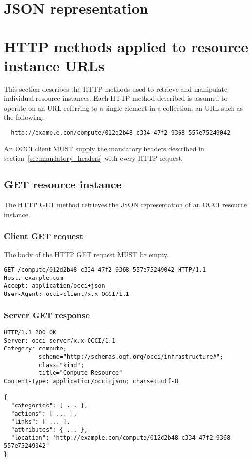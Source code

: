 \documentclass[10pt,a4paper]{article}
\begin{document}
\section{JSON representation}

\section{HTTP methods applied to resource instance URLs}

This section describes the HTTP methods used to retrieve and manipulate
individual resource instances. Each HTTP method described is assumed to operate
on an URL referring to a single element in a collection, an URL such as the
following:
\begin{verbatim}
  http://example.com/compute/012d2b48-c334-47f2-9368-557e75249042
\end{verbatim}

An OCCI client MUST supply the mandatory headers described in
section~\ref{sec:mandatory_headers} with every HTTP request.

\subsection{GET resource instance}
The HTTP GET method retrieves the JSON representation of an OCCI resource
instance.

\subsubsection{Client GET request}
The body of the HTTP GET request MUST be empty.
\begin{verbatim}
GET /compute/012d2b48-c334-47f2-9368-557e75249042 HTTP/1.1
Host: example.com
Accept: application/occi+json
User-Agent: occi-client/x.x OCCI/1.1
\end{verbatim}

\subsubsection{Server GET response}
\begin{verbatim}
HTTP/1.1 200 OK
Server: occi-server/x.x OCCI/1.1
Category: compute;
          scheme="http://schemas.ogf.org/occi/infrastructure#";
          class="kind";
          title="Compute Resource"
Content-Type: application/occi+json; charset=utf-8

{
  "categories": [ ... ],
  "actions": [ ... ],
  "links": [ ... ],
  "attributes": { ... },
  "location": "http://example.com/compute/012d2b48-c334-47f2-9368-557e75249042"
}
\end{verbatim}
\end{document}
